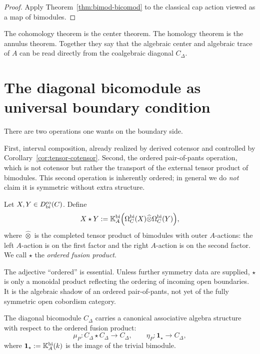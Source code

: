 \begin{proof}
Apply Theorem~\ref{thm:bimod-bicomod} to the classical cap action viewed as a map of bimodules.
\end{proof}

\begin{remark}
The cohomology theorem is the center theorem. The homology theorem is the annulus theorem. Together
they say that the algebraic center and algebraic trace of $A$ can be read directly from the
coalgebraic diagonal $C_\Delta$.
\end{remark}

\section{The diagonal bicomodule as universal boundary condition}
\label{sec:open-trace}

There are two operations one wants on the boundary side.

First, interval composition, already realized by derived cotensor and controlled by
Corollary~\ref{cor:tensor-cotensor}. Second, the ordered pair-of-pants operation, which is not
cotensor but rather the transport of the external tensor product of bimodules. This second
operation is inherently ordered; in general we do \emph{not} claim it is symmetric without extra
structure.

\begin{definition}
Let $X,Y\in D^{\mathrm{co}}_{\mathrm{bi}}(C)$. Define
\[
X\star Y
:=
\mathbb{K}_A^{\mathrm{bi}}\Bigl(
\Omega_C^{\mathrm{bi}}(X)\widehat\otimes \Omega_C^{\mathrm{bi}}(Y)
\Bigr),
\]
where $\widehat\otimes$ is the completed tensor product of bimodules with outer $A$-actions:
the left $A$-action is on the first factor and the right $A$-action is on the second factor.
We call $\star$ the \emph{ordered fusion product}.
\end{definition}

\begin{remark}
The adjective ``ordered'' is essential. Unless further symmetry data are supplied, $\star$ is only
a monoidal product reflecting the ordering of incoming open boundaries. It is the algebraic shadow
of an ordered pair-of-pants, not yet of the fully symmetric open cobordism category.
\end{remark}

\begin{theorem}
\ClaimStatusProvedHere
\label{thm:pair-of-pants}
The diagonal bicomodule $C_\Delta$ carries a canonical associative algebra structure with respect to
the ordered fusion product:
\[
\mu_P:C_\Delta\star C_\Delta\longrightarrow C_\Delta,
\qquad
\eta_P:\mathbf 1_\star\longrightarrow C_\Delta,
\]
where $\mathbf 1_\star:=\mathbb{K}_A^{\mathrm{bi}}(k)$ is the image of the trivial bimodule.
\end{theorem}

